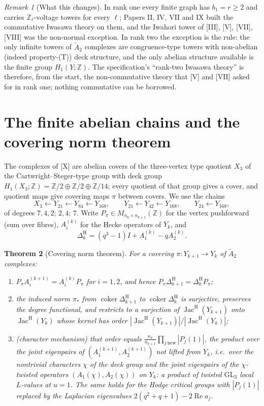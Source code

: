 \documentclass[11pt]{amsart}
\numberwithin{equation}{section}
\newtheorem{theorem}{Theorem}[section]
\theoremstyle{definition}
\theoremstyle{remark}
\newtheorem{remark}[theorem]{Remark}
\newcommand{\Z}{\mathbb{Z}}
\newcommand{\Jac}{\operatorname{Jac}}
\newcommand{\coker}{\operatorname{coker}}
\newcommand{\Atwo}{\widetilde A_2}
\newcommand{\DeltaH}{\Delta^{\mathrm{H}}}
\newcommand{\JacH}{\Jac^{\mathrm{H}}}
\begin{document}
\begin{remark}[What this changes]\label{rem:framework}
In rank one every finite graph has $b_1=r\ge2$ and carries $\Z_\ell$-voltage towers for
every $\ell$; Papers II, IV, VII and IX built the commutative Iwasawa theory on them, and the
Iwahori tower of [III], [V], [VII], [VIII] was the non-normal exception. In rank two the
exception is the rule: the only infinite towers of $\Atwo$ complexes are congruence-type
towers with non-abelian (indeed property-(T)) deck structure, and the only abelian
structure available is the finite group $H_1(Y;\Z)$. The specification's ``rank-two Iwasawa
theory'' is therefore, from the start, the non-commutative theory that [V] and [VII] asked
for in rank one; nothing commutative can be borrowed.
\end{remark}

\section{The finite abelian chains and the covering norm theorem}\label{sec:chain}

The complexes of [X] are abelian covers of the three-vertex type quotient $X_3$ of the
Cartwright--Steger-type group with deck group $H_1(X_3;\Z)=\Z/2\oplus\Z/2\oplus\Z/14$; every
quotient of that group gives a cover, and quotient maps give covering maps $\pi$ between
covers. We use the chains
\[
X_3\leftarrow Y_{21}\leftarrow Y_{84}\leftarrow Y_{168},\qquad
Y_{21}\leftarrow Y_{42}\leftarrow Y_{168},\qquad Y_{24}\leftarrow Y_{168},
\]
of degrees $7,4,2$; $2,4$; $7$. Write $P_\pi\in M_{n_k\times n_{k+1}}(\Z)$ for the vertex
pushforward (sum over fibres), $A_i^{(k)}$ for the Hecke operators of $Y_k$, and
\[
\DeltaH_k=(q^{3}-1)I+A_1^{(k)}-qA_2^{(k)} .
\]

\begin{theorem}[Covering norm theorem]\label{thm:norm}
For a covering $\pi\colon Y_{k+1}\to Y_k$ of $\Atwo$ complexes:
\begin{enumerate}
\item[(i)] $P_\pi A_i^{(k+1)}=A_i^{(k)}P_\pi$ for $i=1,2$, and hence
$P_\pi\DeltaH_{k+1}=\DeltaH_kP_\pi$;
\item[(ii)] the induced norm $\pi_*$ from $\coker\DeltaH_{k+1}$ to $\coker\DeltaH_k$ is
surjective, preserves the degree functional, and restricts to a surjection of
$\JacH(Y_{k+1})$ onto $\JacH(Y_k)$ whose kernel has order $|\JacH(Y_{k+1})|/|\JacH(Y_k)|$;
\item[(iii)] (character mechanism) that order equals
$\frac{n_k}{n_{k+1}}\prod_{j\ \mathrm{new}}|P_j(1)|$, the product over the joint eigenpairs of
$(A_1^{(k+1)},A_2^{(k+1)})$ not lifted from $Y_k$, i.e.\ over the nontrivial characters
$\chi$ of the deck group and the joint eigenpairs of the $\chi$-twisted operators
$(A_1(\chi),A_2(\chi))$ on $Y_k$: a product of twisted $\mathrm{GL}_3$ local $L$-values at
$u=1$. The same holds for the Hodge critical groups with $|P_j(1)|$ replaced by the
Laplacian eigenvalues $2(q^{2}+q+1)-2\operatorname{Re}a_j$.
\end{enumerate}
\end{theorem}
\end{document}

